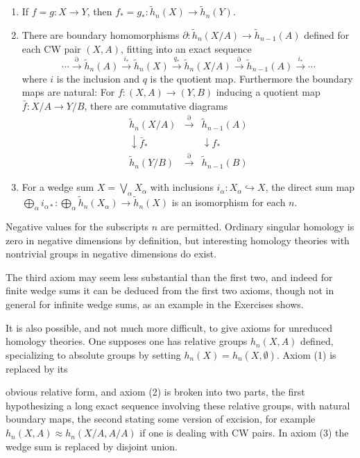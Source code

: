 \begin{enumerate}
\item If $f = g : X \to Y$, then $f_* = g_* : \tilde{h}_n(X) \to \tilde{h}_n(Y)$.

\item There are boundary homomorphisms $\partial : \tilde{h}_n(X/A) \to \tilde{h}_{n-1}(A)$ defined for each CW pair $(X,A)$, fitting into an exact sequence
\[ \cdots \xrightarrow{\partial} \tilde{h}_n(A) \xrightarrow{i_*} \tilde{h}_n(X) \xrightarrow{q_*} \tilde{h}_n(X/A) \xrightarrow{\partial} \tilde{h}_{n-1}(A) \xrightarrow{i_*} \cdots \]
where $i$ is the inclusion and $q$ is the quotient map. Furthermore the boundary maps are natural: For $f : (X,A) \to (Y,B)$ inducing a quotient map $\bar{f} : X/A \to Y/B$, there are commutative diagrams
\[
\begin{array}{ccc}
\tilde{h}_n(X/A) & \xrightarrow{\partial} & \tilde{h}_{n-1}(A) \\
\downarrow \bar{f}_* & & \downarrow f_* \\
\tilde{h}_n(Y/B) & \xrightarrow{\partial} & \tilde{h}_{n-1}(B)
\end{array}
\]

\item For a wedge sum $X = \bigvee_\alpha X_\alpha$ with inclusions $i_\alpha : X_\alpha \hookrightarrow X$, the direct sum map $\bigoplus_\alpha i_{\alpha *} : \bigoplus_\alpha \tilde{h}_n(X_\alpha) \to \tilde{h}_n(X)$ is an isomorphism for each $n$.
\end{enumerate}

Negative values for the subscripts $n$ are permitted. Ordinary singular homology is zero in negative dimensions by definition, but interesting homology theories with nontrivial groups in negative dimensions do exist.

The third axiom may seem less substantial than the first two, and indeed for finite wedge sums it can be deduced from the first two axioms, though not in general for infinite wedge sums, as an example in the Exercises shows.

It is also possible, and not much more difficult, to give axioms for unreduced homology theories. One supposes one has relative groups $h_n(X,A)$ defined, specializing to absolute groups by setting $h_n(X) = h_n(X, \emptyset)$. Axiom (1) is replaced by its

obvious relative form, and axiom (2) is broken into two parts, the first hypothesizing a long exact sequence involving these relative groups, with natural boundary maps, the second stating some version of excision, for example $h_n(X, A) \approx h_n(X/A, A/A)$ if one is dealing with CW pairs. In axiom (3) the wedge sum is replaced by disjoint union.

